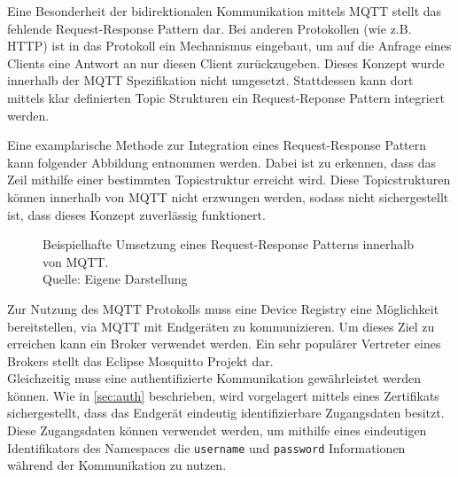 Eine Besonderheit der bidirektionalen Kommunikation mittels \ac{MQTT} stellt das fehlende Request-Response Pattern dar. Bei anderen Protokollen (wie z.B. HTTP) ist in das Protokoll ein Mechanismus eingebaut, um auf die Anfrage eines Clients eine Antwort an nur diesen Client zurückzugeben. Dieses Konzept wurde innerhalb der MQTT Spezifikation nicht umgesetzt. Stattdessen kann dort mittels klar definierten Topic Strukturen ein Request-Reponse Pattern integriert werden.
\pagebreak
\begin{example} Eine examplarische Methode zur Integration eines Request-Response Pattern kann folgender Abbildung entnommen werden. Dabei ist zu erkennen, dass das Zeil mithilfe einer bestimmten Topicstruktur erreicht wird. Diese Topicstrukturen können innerhalb von MQTT nicht erzwungen werden, sodass nicht sichergestellt ist, dass dieses Konzept zuverlässig funktionert.

    \begin{figure}[h]
        \centering
        \caption[Request-Response Pattern innerhalb von MQTT]{Beispielhafte Umsetzung eines Request-Response Patterns innerhalb von MQTT.\\Quelle: Eigene Darstellung}
    \end{figure}
\end{example}

Zur Nutzung des \ac{MQTT} Protokolls muss eine Device Registry eine Möglichkeit bereitstellen, via MQTT mit Endgeräten zu kommunizieren. Um dieses Ziel zu erreichen kann ein Broker verwendet werden. Ein sehr populärer Vertreter eines Brokers stellt das Eclipse Mosquitto Projekt dar.\\
Gleichzeitig muss eine authentifizierte Kommunikation gewährleistet werden können. Wie in \vref{sec:auth} beschrieben, wird vorgelagert mittels eines Zertifikats sichergestellt, dass das Endgerät eindeutig identifizierbare Zugangsdaten besitzt. Diese Zugangsdaten können verwendet werden, um mithilfe eines eindeutigen Identifikators des Namespaces die \texttt{username} und \texttt{password} Informationen während der Kommunikation zu nutzen.

